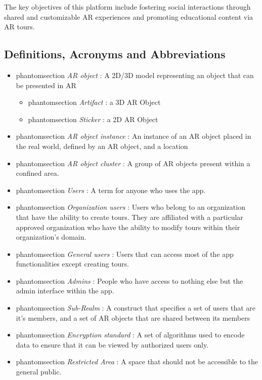 \documentclass{article}
\makeatletter
\newcommand{\labeltext}[3][]{%
    \@bsphack%
    \csname phantomsection\endcsname%
    \def\tst{#1}%
    \def\labelmarkup{\emph}%
    \def\refmarkup{}%
    \ifx\tst\empty\def\@currentlabel{\refmarkup{#2}}{\label{#3}}%
    \else\def\@currentlabel{\refmarkup{#1}}{\label{#3}}\fi%
    \@esphack%
    \labelmarkup{#2}%
}
\makeatother
\begin{document}
The key objectives of this platform include fostering social interactions through shared and customizable AR experiences and promoting educational content via AR tours.

\subsection{Definitions, Acronyms and Abbreviations}
\label{sub:def_acr_abb}

\begin{itemize}
    \item \labeltext{AR object}{def:ar_obj}: A 2D/3D model representing an object that can be presented in AR
          \begin{itemize}
              \item \labeltext{Artifact}{def:artifact}: a 3D AR Object
              \item \labeltext{Sticker}{def:sticker}: a 2D AR Object
          \end{itemize}
    \item \labeltext{AR object instance}{def:ar_obj_instance}: An instance of an AR object placed in the real world, defined by an AR object, and a location
    \item \labeltext{AR object cluster}{def:ar_obj_cls}: A group of AR objects present within a confined area.
    \item \labeltext{Users}{def:user}: A term for anyone who uses the app.
    \item \labeltext{Organization users}{def:org_user}: Users who belong to an organization that have the ability to create tours. They are affiliated with a particular approved organization who have the ability to modify tours within their organization’s domain.
    \item \labeltext{General users}{def:gen_user}: Users that can access most of the app functionalities except creating tours.
    \item \labeltext{Admins}{def:admin}: People who have access to nothing else but the admin interface within the app.
    \item \labeltext{Sub-Realm}{def:sub_realm}: A construct that specifies a set of users that are it’s members, and a set of AR objects that are shared between its members
    \item \labeltext{Encryption standard}{def:encryption_standard}: A set of algorithms used to encode data to ensure that it can be viewed by authorized users only.
    \item \labeltext{Restricted Area}{def:restricted_area}: A space that should not be accessible to the general public.
\end{itemize}
\end{document}
